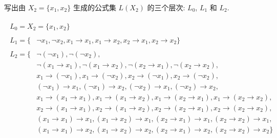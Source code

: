 \documentclass[boxes]{homework}
\begin{document}
\begin{problem}
    写出由 $X_2=\{x_1, x_2\}$ 生成的公式集 $L(X_2)$ 的三个层次: $L_0$, $L_1$ 和 $L_2$.
\end{problem}
\begin{solution}
    \begin{gather}
        \begin{aligned}
            L_0=X_2=\{x_1, x_2\}
        \end{aligned}\\
        \begin{aligned}
            L_1=\{&\lnot x_1, \lnot x_2, x_1\to x_1, x_1 \to x_2, x_2\to x_1, x_2\to x_2\}
        \end{aligned}\\
        \begin{aligned}
            L_2=\{&\lnot(\lnot x_1), \lnot(\lnot x_2),\\
                  &\lnot(x_1\to x_1), \lnot(x_1\to x_2), \lnot(x_2\to x_1), \lnot(x_2\to x_2),\\
                  &x_1\to(\lnot x_1), x_1\to (\lnot x_2), x_2\to (\lnot x_1), x_2\to (\lnot x_2),\\
                  &(\lnot x_1)\to x_1, (\lnot x_1)\to x_2, (\lnot x_2)\to x_1, (\lnot x_2)\to x_2,\\
                  &x_1\to(x_1\to x_1), x_1\to(x_1\to x_2), x_1\to(x_2\to x_1), x_1\to(x_2\to x_2),\\
                  &x_2\to(x_1\to x_1), x_2\to(x_1\to x_2), x_2\to(x_2\to x_1), x_2\to(x_2\to x_2),\\
                  &(x_1\to x_1)\to x_1, (x_1\to x_2)\to x_1, (x_2\to x_1)\to x_1, (x_2\to x_2)\to x_1,\\
                  &(x_1\to x_1)\to x_2, (x_1\to x_2)\to x_2, (x_2\to x_1)\to x_2, (x_2\to x_2)\to x_2\}
        \end{aligned}
    \end{gather}
\end{solution}
\end{document}
